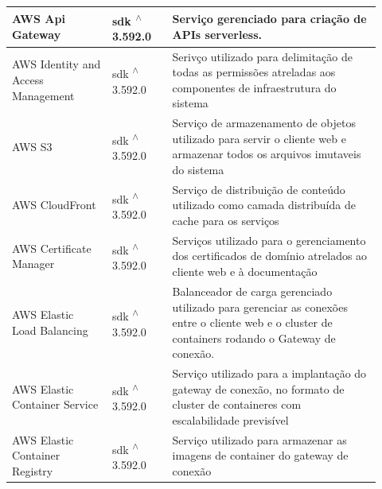 \begin{longtable}{p{0.25\linewidth} p{0.15\linewidth} p{0.525\linewidth}}
\hline

AWS Api Gateway \citep{awsapigatewaydocs} & sdk \textsuperscript{$\wedge$}3.592.0 & Serviço gerenciado para criação de APIs serverless. \\

\hline

AWS Identity and Access Management \citep{awsiamdocs} & sdk \textsuperscript{$\wedge$}3.592.0 & Serivço utilizado para delimitação de todas as permissões atreladas aos componentes de infraestrutura do sistema \\

\hline

AWS S3 \citep{awss3docs} & sdk \textsuperscript{$\wedge$}3.592.0 & Serviço de armazenamento de objetos utilizado para servir o cliente web e armazenar todos os arquivos imutaveis do sistema \\

\hline

AWS CloudFront \citep{awscloudfrontdocs} & sdk \textsuperscript{$\wedge$}3.592.0 & Serviço de distribuição de conteúdo utilizado como camada distribuída de cache para os serviços \\

\hline

AWS Certificate Manager \citep{awscertificatemanagerdocs} & sdk \textsuperscript{$\wedge$}3.592.0 & Serviços utilizado para o gerenciamento dos certificados de domínio atrelados ao cliente web e à documentação \\

\hline

AWS Elastic Load Balancing \citep{awselasticloadbalancing} & sdk \textsuperscript{$\wedge$}3.592.0 & Balanceador de carga gerenciado utilizado para gerenciar as conexões entre o cliente web e o cluster de containers rodando o Gateway de conexão. \\

\hline

AWS Elastic Container Service \citep{awsecsdocs} & sdk \textsuperscript{$\wedge$}3.592.0 & Serviço utilizado para a implantação do gateway de conexão, no formato de cluster de containeres com escalabilidade previsível \\

\hline

AWS Elastic Container Registry \citep{awsecrdocs} & sdk \textsuperscript{$\wedge$}3.592.0 & Serviço utilizado para armazenar as imagens de container do gateway de conexão \\


\end{longtable}
